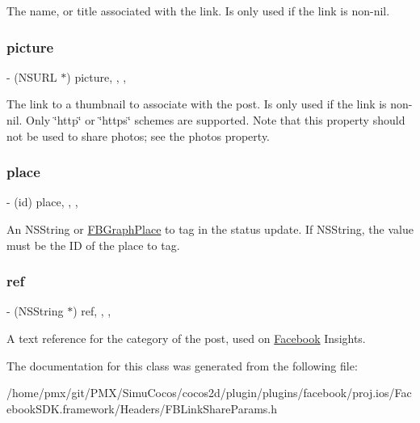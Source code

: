 The name, or title associated with the link. Is only used if the link is non-\/nil. \mbox{\label{interfaceFBLinkShareParams_a5b3fc50595d7e789b1abdcf0b499d88c}} 
\subsubsection{\texorpdfstring{picture}{picture}}
{\footnotesize\ttfamily -\/ (N\+S\+U\+RL $\ast$) picture\hspace{0.3cm}{\ttfamily [read]}, {\ttfamily [write]}, {\ttfamily [nonatomic]}, {\ttfamily [copy]}}

The link to a thumbnail to associate with the post. Is only used if the link is non-\/nil. Only \char`\"{}http\char`\"{} or \char`\"{}https\char`\"{} schemes are supported. Note that this property should not be used to share photos; see the photos property. \mbox{\label{interfaceFBLinkShareParams_af541ef9ee605422b1d8f658078564f8e}} 
\subsubsection{\texorpdfstring{place}{place}}
{\footnotesize\ttfamily -\/ (id) place\hspace{0.3cm}{\ttfamily [read]}, {\ttfamily [write]}, {\ttfamily [nonatomic]}, {\ttfamily [copy]}}

An N\+S\+String or \hyperlink{protocolFBGraphPlace-p}{F\+B\+Graph\+Place} to tag in the status update. If N\+S\+String, the value must be the ID of the place to tag. \mbox{\label{interfaceFBLinkShareParams_ad46be56767edc2c1dca8e7d16bfda278}} 
\subsubsection{\texorpdfstring{ref}{ref}}
{\footnotesize\ttfamily -\/ (N\+S\+String $\ast$) ref\hspace{0.3cm}{\ttfamily [read]}, {\ttfamily [write]}, {\ttfamily [nonatomic]}, {\ttfamily [copy]}}

A text reference for the category of the post, used on \hyperlink{interfaceFacebook}{Facebook} Insights. 

The documentation for this class was generated from the following file\+:\begin{DoxyCompactItemize}
\item 
/home/pmx/git/\+P\+M\+X/\+Simu\+Cocos/cocos2d/plugin/plugins/facebook/proj.\+ios/\+Facebook\+S\+D\+K.\+framework/\+Headers/F\+B\+Link\+Share\+Params.\+h\end{DoxyCompactItemize}
